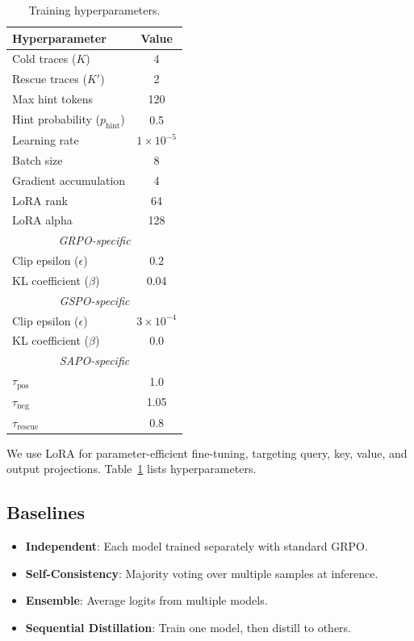 \documentclass[11pt]{article}
\begin{document}
\begin{table}[t]
    \centering
    \small
    \begin{tabular}{lc}
        \toprule
        \textbf{Hyperparameter} & \textbf{Value} \\
        \midrule
        Cold traces ($K$) & 4 \\
        Rescue traces ($K'$) & 2 \\
        Max hint tokens & 120 \\
        Hint probability ($p_{\text{hint}}$) & 0.5 \\
        Learning rate & $1 \times 10^{-5}$ \\
        Batch size & 8 \\
        Gradient accumulation & 4 \\
        LoRA rank & 64 \\
        LoRA alpha & 128 \\
        \midrule
        \multicolumn{2}{c}{\textit{GRPO-specific}} \\
        Clip epsilon ($\epsilon$) & 0.2 \\
        KL coefficient ($\beta$) & 0.04 \\
        \midrule
        \multicolumn{2}{c}{\textit{GSPO-specific}} \\
        Clip epsilon ($\epsilon$) & $3 \times 10^{-4}$ \\
        KL coefficient ($\beta$) & 0.0 \\
        \midrule
        \multicolumn{2}{c}{\textit{SAPO-specific}} \\
        $\tau_{\text{pos}}$ & 1.0 \\
        $\tau_{\text{neg}}$ & 1.05 \\
        $\tau_{\text{rescue}}$ & 0.8 \\
        \bottomrule
    \end{tabular}
    \caption{Training hyperparameters.}
    \label{tab:hyperparams}
\end{table}

We use LoRA \citep{hu2022lora} for parameter-efficient fine-tuning, targeting query, key, value, and output projections. Table~\ref{tab:hyperparams} lists hyperparameters.

\subsection{Baselines}

\begin{itemize}
    \item \textbf{Independent}: Each model trained separately with standard GRPO.
    \item \textbf{Self-Consistency}: Majority voting over multiple samples at inference.
    \item \textbf{Ensemble}: Average logits from multiple models.
    \item \textbf{Sequential Distillation}: Train one model, then distill to others.
\end{itemize}
\end{document}
